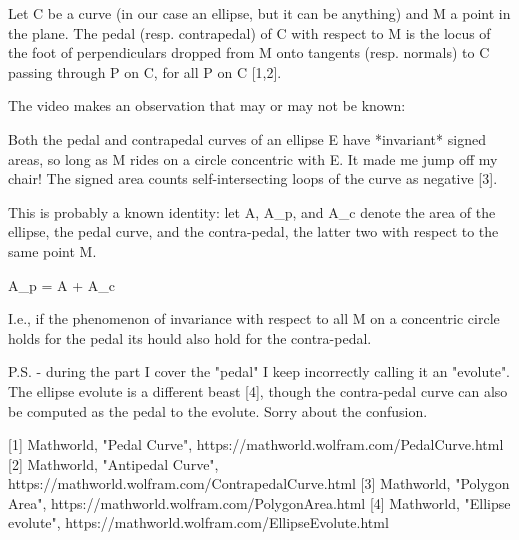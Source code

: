 Let C be a curve (in our case an ellipse, but it can be anything) and M a point in the plane. The pedal (resp. contrapedal) of C with respect to M is the locus of the foot of perpendiculars dropped from M onto tangents (resp. normals) to C passing through P on C, for all P on C [1,2].

The video makes an observation that may or may not be known:

Both the pedal and contrapedal curves of an ellipse E have *invariant* signed areas, so long as M rides on a circle concentric with E. It made me jump off my chair! The signed area counts self-intersecting loops of the curve as negative [3]. 

This is probably a known identity: let A, A_p, and A_c denote the area of the ellipse, the pedal curve, and the contra-pedal, the latter two with respect to the same point M. 

A_p = A + A_c

I.e., if the phenomenon of invariance with respect to all M on a concentric circle holds for the pedal its hould also hold for the contra-pedal.

P.S. - during the part I cover the "pedal"  I keep incorrectly calling it an "evolute". The ellipse evolute is a different beast [4], though the contra-pedal curve can also be computed as the pedal to the evolute. Sorry about the confusion.

[1] Mathworld, "Pedal Curve", https://mathworld.wolfram.com/PedalCurve.html
[2] Mathworld, "Antipedal Curve", https://mathworld.wolfram.com/ContrapedalCurve.html
[3] Mathworld, "Polygon Area", https://mathworld.wolfram.com/PolygonArea.html
[4] Mathworld, "Ellipse evolute", https://mathworld.wolfram.com/EllipseEvolute.html